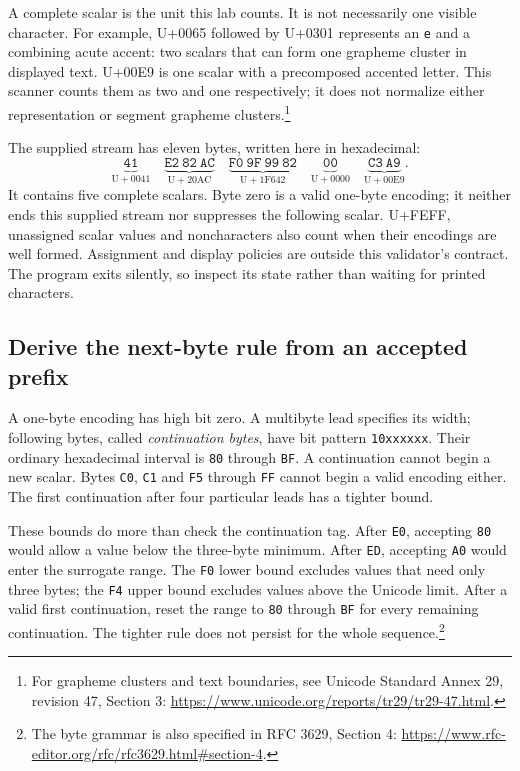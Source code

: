 A complete scalar is the unit this lab counts. It is not necessarily one visible
character. For example, U+0065 followed by U+0301 represents an \texttt{e} and a
combining acute accent: two scalars that can form one grapheme cluster in displayed
text. U+00E9 is one scalar with a precomposed accented letter. This scanner counts
them as two and one respectively; it does not normalize either representation or
segment grapheme clusters.\footnote{For grapheme clusters and text boundaries,
  see Unicode Standard Annex 29, revision 47, Section 3:
  \url{https://www.unicode.org/reports/tr29/tr29-47.html}.}

The supplied stream has eleven bytes, written here in hexadecimal:
\[
  \underbrace{\mathtt{41}}_{\mathrm{U+0041}}\quad
  \underbrace{\mathtt{E2\ 82\ AC}}_{\mathrm{U+20AC}}\quad
  \underbrace{\mathtt{F0\ 9F\ 99\ 82}}_{\mathrm{U+1F642}}\quad
  \underbrace{\mathtt{00}}_{\mathrm{U+0000}}\quad
  \underbrace{\mathtt{C3\ A9}}_{\mathrm{U+00E9}}.
\]
It contains five complete scalars. Byte zero is a valid one-byte encoding; it
neither ends this supplied stream nor suppresses the following scalar. U+FEFF,
unassigned scalar values and noncharacters also count when their encodings are
well formed. Assignment and display policies are outside this validator's contract.
The program exits silently, so inspect its state rather than waiting for printed
characters.

\subsection*{Derive the next-byte rule from an accepted prefix}

A one-byte encoding has high bit zero. A multibyte lead specifies its width;
following bytes, called \emph{continuation bytes}, have bit pattern
\texttt{10xxxxxx}. Their ordinary hexadecimal interval is \texttt{80} through
\texttt{BF}. A continuation cannot begin a new scalar. Bytes \texttt{C0},
\texttt{C1} and \texttt{F5} through \texttt{FF} cannot begin a valid encoding
either. The first continuation after four particular leads has a tighter bound.



These bounds do more than check the continuation tag. After \texttt{E0}, accepting
\texttt{80} would allow a value below the three-byte minimum. After \texttt{ED},
accepting \texttt{A0} would enter the surrogate range. The \texttt{F0} lower bound
excludes values that need only three bytes; the \texttt{F4} upper bound excludes
values above the Unicode limit. After a valid first continuation, reset the range
to \texttt{80} through \texttt{BF} for every remaining continuation. The tighter
rule does not persist for the whole sequence.\footnote{The byte grammar is also
  specified in RFC 3629, Section 4:
  \url{https://www.rfc-editor.org/rfc/rfc3629.html\#section-4}.}

